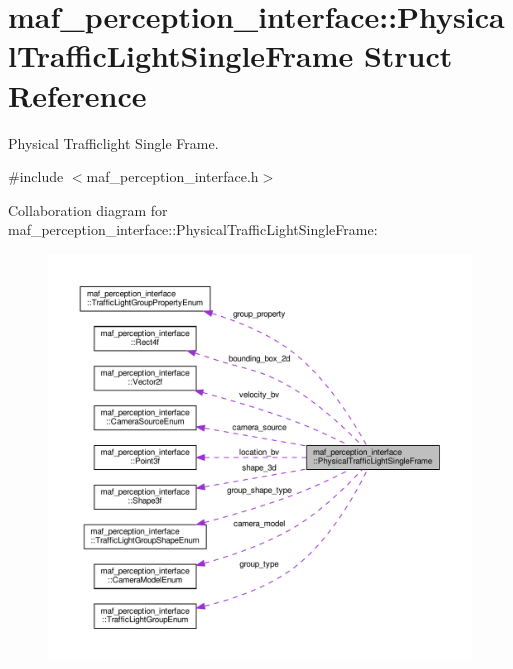 \hypertarget{structmaf__perception__interface_1_1PhysicalTrafficLightSingleFrame}{}\section{maf\+\_\+perception\+\_\+interface\+:\+:Physical\+Traffic\+Light\+Single\+Frame Struct Reference}
\label{structmaf__perception__interface_1_1PhysicalTrafficLightSingleFrame}


Physical Trafficlight Single Frame.  




{\ttfamily \#include $<$maf\+\_\+perception\+\_\+interface.\+h$>$}



Collaboration diagram for maf\+\_\+perception\+\_\+interface\+:\+:Physical\+Traffic\+Light\+Single\+Frame\+:\nopagebreak
\begin{figure}[H]
\begin{center}
\leavevmode
\includegraphics[width=350pt]{structmaf__perception__interface_1_1PhysicalTrafficLightSingleFrame__coll__graph}
\end{center}
\end{figure}
